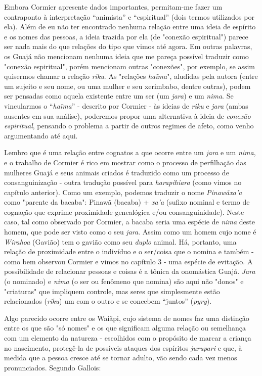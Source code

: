 Embora Cormier apresente dados importantes, permitam-me fazer um
contraponto à interpretação ``animista'' e ``espiritual'' (dois termos
utilizados por ela). Além de eu não ter encontrado nenhuma relação entre
uma ideia de espírito e os nomes das pessoas, a ideia trazida por ela
(de "conexão espiritual") parece ser nada mais do que relações do tipo
que vimos até agora. Em outras palavras, os Guajá não mencionam nenhuma
ideia que me pareça possível traduzir como "conexão espiritual", porém
mencionam outras "conexões", por exemplo, se assim quisermos chamar a
relação \emph{riku}. As "relações \emph{haĩma}", aludidas pela autora
(entre um sujeito e seu nome, ou uma mulher e seu xerimbabo, dentre
outras), podem ser pensadas como aquela existente entre um ser (um
\emph{jara}) e um \emph{nima}. Se vincularmos o ``\emph{haĩma}'' -
descrito por Cormier - às ideias de \emph{riku} e \emph{jara} (ambas
ausentes em sua análise), poderemos propor uma alternativa à ideia de
\emph{conexão espiritual}, pensando o problema a partir de outros
regimes de afeto, como venho argumentando até aqui.

Lembro que é uma relação entre cognatos a que ocorre entre um
\emph{jara} e um \emph{nima}, e o trabalho de Cormier é rico em mostrar
como o processo de perfilhação das mulheres Guajá e seus animais criados
é traduzido como um processo de consanguinização - outra tradução
possível para \emph{harapihiara} (como vimos no capítulo anterior). Como
um exemplo, podemos traduzir o nome \emph{Pinawãxa'a} como "parente da
bacaba": Pinawã (bacaba) + \emph{xa'a} (sufixo nominal e termo de
cognação que exprime proximidade genealógica e/ou consanguinidade).
Neste caso, tal como observado por Cormier, a bacaba seria uma espécie
de \emph{nima} deste homem, que pode ser visto como o seu \emph{jara}.
Assim como um homem cujo nome é \emph{Wirahoa} (Gavião) tem o gavião
como seu \emph{duplo} animal. Há, portanto, uma relação de proximidade
entre o indivíduo e o ser/coisa que o nomina e também - como bem
observou Cormier e vimos no capítulo 3 - uma espécie de evitação. A
possibilidade de relacionar pessoas e coisas é a tônica da onomástica
Guajá. \emph{Jara} (o nominado) e \emph{nima} (o ser ou fenômeno que
nomina) são aqui não "donos" e "criaturas" que impliquem controle, mas
seres que simplesmente estão relacionados (\emph{riku}) um com o outro e
se concebem ``juntos'' (\emph{pyry}).

Algo parecido ocorre entre os Waiãpi, cujo sistema de nomes faz uma
distinção entre os que são "só nomes" e os que significam alguma relação
ou semelhança com um elemento da natureza - escolhidos com o propósito
de marcar a criança no nascimento, protegê-la de possíveis ataques dos
espíritos \emph{jurupari} e que, à medida que a pessoa cresce até se
tornar adulto, vão sendo cada vez menos pronunciados. Segundo Gallois:

